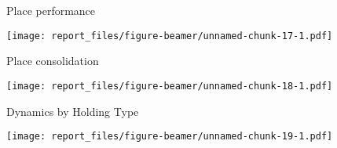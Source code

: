 \documentclass[ignorenonframetext,]{beamer}
\begin{document}
\begin{frame}{Place performance}
\protect\hypertarget{place-performance}{}

\texttt{[image: report\_files/figure-beamer/unnamed-chunk-17-1.pdf]}

\end{frame}

\begin{frame}{Place consolidation}
\protect\hypertarget{place-consolidation}{}

\texttt{[image: report\_files/figure-beamer/unnamed-chunk-18-1.pdf]}

\end{frame}

\begin{frame}{Dynamics by Holding Type}
\protect\hypertarget{dynamics-by-holding-type}{}

\texttt{[image: report\_files/figure-beamer/unnamed-chunk-19-1.pdf]}

\end{frame}
\end{document}

